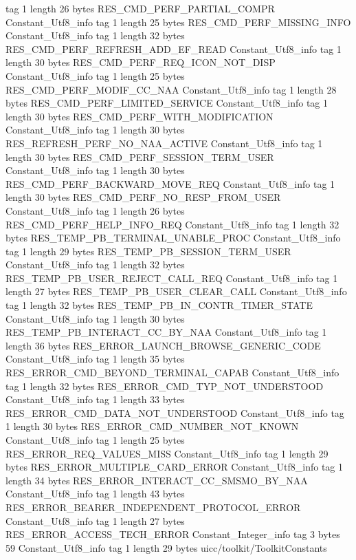 {{{			tag	1
			length	26
			bytes	RES_CMD_PERF_PARTIAL_COMPR
		}
		Constant_Utf8_info {
			tag	1
			length	25
			bytes	RES_CMD_PERF_MISSING_INFO
		}
		Constant_Utf8_info {
			tag	1
			length	32
			bytes	RES_CMD_PERF_REFRESH_ADD_EF_READ
		}
		Constant_Utf8_info {
			tag	1
			length	30
			bytes	RES_CMD_PERF_REQ_ICON_NOT_DISP
		}
		Constant_Utf8_info {
			tag	1
			length	25
			bytes	RES_CMD_PERF_MODIF_CC_NAA
		}
		Constant_Utf8_info {
			tag	1
			length	28
			bytes	RES_CMD_PERF_LIMITED_SERVICE
		}
		Constant_Utf8_info {
			tag	1
			length	30
			bytes	RES_CMD_PERF_WITH_MODIFICATION
		}
		Constant_Utf8_info {
			tag	1
			length	30
			bytes	RES_REFRESH_PERF_NO_NAA_ACTIVE
		}
		Constant_Utf8_info {
			tag	1
			length	30
			bytes	RES_CMD_PERF_SESSION_TERM_USER
		}
		Constant_Utf8_info {
			tag	1
			length	30
			bytes	RES_CMD_PERF_BACKWARD_MOVE_REQ
		}
		Constant_Utf8_info {
			tag	1
			length	30
			bytes	RES_CMD_PERF_NO_RESP_FROM_USER
		}
		Constant_Utf8_info {
			tag	1
			length	26
			bytes	RES_CMD_PERF_HELP_INFO_REQ
		}
		Constant_Utf8_info {
			tag	1
			length	32
			bytes	RES_TEMP_PB_TERMINAL_UNABLE_PROC
		}
		Constant_Utf8_info {
			tag	1
			length	29
			bytes	RES_TEMP_PB_SESSION_TERM_USER
		}
		Constant_Utf8_info {
			tag	1
			length	32
			bytes	RES_TEMP_PB_USER_REJECT_CALL_REQ
		}
		Constant_Utf8_info {
			tag	1
			length	27
			bytes	RES_TEMP_PB_USER_CLEAR_CALL
		}
		Constant_Utf8_info {
			tag	1
			length	32
			bytes	RES_TEMP_PB_IN_CONTR_TIMER_STATE
		}
		Constant_Utf8_info {
			tag	1
			length	30
			bytes	RES_TEMP_PB_INTERACT_CC_BY_NAA
		}
		Constant_Utf8_info {
			tag	1
			length	36
			bytes	RES_ERROR_LAUNCH_BROWSE_GENERIC_CODE
		}
		Constant_Utf8_info {
			tag	1
			length	35
			bytes	RES_ERROR_CMD_BEYOND_TERMINAL_CAPAB
		}
		Constant_Utf8_info {
			tag	1
			length	32
			bytes	RES_ERROR_CMD_TYP_NOT_UNDERSTOOD
		}
		Constant_Utf8_info {
			tag	1
			length	33
			bytes	RES_ERROR_CMD_DATA_NOT_UNDERSTOOD
		}
		Constant_Utf8_info {
			tag	1
			length	30
			bytes	RES_ERROR_CMD_NUMBER_NOT_KNOWN
		}
		Constant_Utf8_info {
			tag	1
			length	25
			bytes	RES_ERROR_REQ_VALUES_MISS
		}
		Constant_Utf8_info {
			tag	1
			length	29
			bytes	RES_ERROR_MULTIPLE_CARD_ERROR
		}
		Constant_Utf8_info {
			tag	1
			length	34
			bytes	RES_ERROR_INTERACT_CC_SMSMO_BY_NAA
		}
		Constant_Utf8_info {
			tag	1
			length	43
			bytes	RES_ERROR_BEARER_INDEPENDENT_PROTOCOL_ERROR
		}
		Constant_Utf8_info {
			tag	1
			length	27
			bytes	RES_ERROR_ACCESS_TECH_ERROR
		}
		Constant_Integer_info {
			tag	3
			bytes	59
		}
		Constant_Utf8_info {
			tag	1
			length	29
			bytes	uicc/toolkit/ToolkitConstants
}}}
